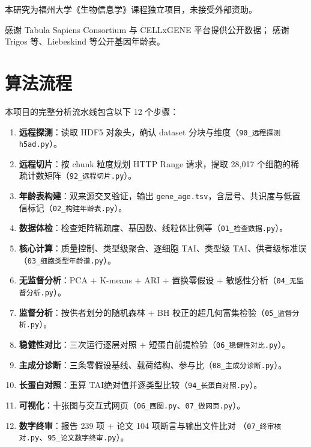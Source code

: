 \documentclass[UTF8, a4paper, 11pt]{ctexart}
\newcommand{\tai}{\textsc{TAI}}
\newcommand{\code}[1]{\texttt{\small #1}}
\begin{document}
\vspace{0.35em}
本研究为福州大学《生物信息学》课程独立项目，未接受外部资助。

\vspace{0.35em}
感谢 Tabula Sapiens Consortium 与 CELLxGENE 平台提供公开数据；
感谢 Trigos 等、Liebeskind 等公开基因年龄表。

\begingroup
\small


\endgroup

\newpage
\appendix
\renewcommand{\thesection}{附录\,\Alph{section}}
\setcounter{section}{0}

\section{算法流程}

本项目的完整分析流水线包含以下 12 个步骤：

\begin{enumerate}[label=\textbf{S\arabic*.}, leftmargin=3.4em]
  \item \textbf{远程探测}：读取 HDF5 对象头，确认 dataset 分块与维度（\code{90\_远程探测h5ad.py}）。
  \item \textbf{远程切片}：按 chunk 粒度规划 HTTP Range 请求，提取 28,017 个细胞的稀疏计数矩阵（\code{92\_远程切片.py}）。
  \item \textbf{年龄表构建}：双来源交叉验证，输出 \code{gene\_age.tsv}，含层号、共识度与低置信标记（\code{02\_构建年龄表.py}）。
  \item \textbf{数据体检}：检查矩阵稀疏度、基因数、线粒体比例等（\code{01\_检查数据.py}）。
  \item \textbf{核心计算}：质量控制、类型级聚合、逐细胞 \tai、类型级 \tai、供者级标准误（\code{03\_细胞类型年龄谱.py}）。
  \item \textbf{无监督分析}：PCA $+$ K-means $+$ ARI $+$ 置换零假设 $+$ 敏感性分析（\code{04\_无监督分析.py}）。
  \item \textbf{监督分析}：按供者划分的随机森林 $+$ BH 校正的超几何富集检验（\code{05\_监督分析.py}）。
  \item \textbf{稳健性对比}：三次运行逐层对照 $+$ 短蛋白前提检验（\code{06\_稳健性对比.py}）。
  \item \textbf{主成分诊断}：三条零假设基线、载荷结构、参与比（\code{08\_主成分诊断.py}）。
  \item \textbf{长蛋白对照}：重算 \tai 绝对值并逐类型比较（\code{94\_长蛋白对照.py}）。
  \item \textbf{可视化}：十张图与交互式网页（\code{06\_画图.py}、\code{07\_做网页.py}）。
  \item \textbf{数字终审}：报告 239 项 $+$ 论文 104 项断言与输出文件比对
        （\code{07\_终审核对.py}、\code{95\_论文数字终审.py}）。
\end{enumerate}
\end{document}
